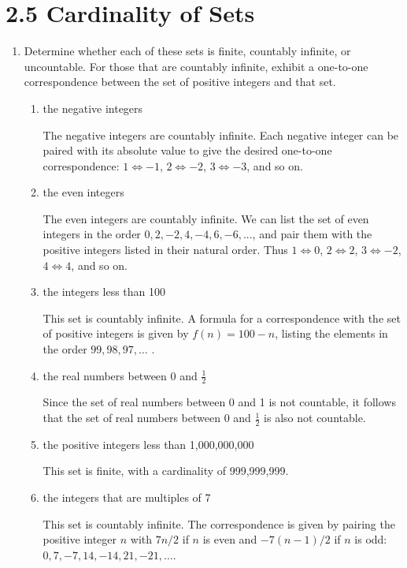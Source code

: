 \documentclass[11pt]{article}
\begin{document}
\section*{\textbf{2.5 Cardinality of Sets}}
\begin{enumerate}[label=\textbf{\arabic*.}]
	\item Determine whether each of these sets is finite, countably infinite, or uncountable. For those that are countably infinite, exhibit a one-to-one correspondence between the set of positive integers and that set.
	
	\begin{enumerate}[label=\textbf{\alph*)}]
		\item the negative integers
		
		The negative integers are countably infinite. Each negative integer can be paired with its absolute value to give the desired one-to-one correspondence: $1 \iff -1$, $2 \iff -2$, $3 \iff -3$, and so on.
		
		\item the even integers
		
		The even integers are countably infinite. We can list the set of even integers in the order $0, 2, -2, 4, -4, 6, -6, ...$, and pair them with the positive integers listed in their natural order. Thus $1 \iff 0$, $2 \iff 2$, $3 \iff -2$, $4 \iff 4$, and so on.
		
		\item the integers less than 100
		
		This set is countably infinite. A formula for a correspondence with the set of positive integers is given by $f(n) = 100 - n$, listing the elements in the order $99, 98, 97, \ldots$ .
		
		\item the real numbers between 0 and $\frac{1}{2}$
		
		Since the set of real numbers between 0 and 1 is not countable, it follows that the set of real numbers between 0 and $\frac{1}{2}$ is also not countable.
		
		\item the positive integers less than 1,000,000,000
		
		This set is finite, with a cardinality of 999,999,999.
		
		\item the integers that are multiples of 7
		
		This set is countably infinite. The correspondence is given by pairing the positive integer $n$ with $7n/2$ if $n$ is even and $-7(n - 1)/2$ if $n$ is odd: $0, 7, -7, 14, -14, 21, -21, \ldots$.
	\end{enumerate}


\end{enumerate}
\end{document}

